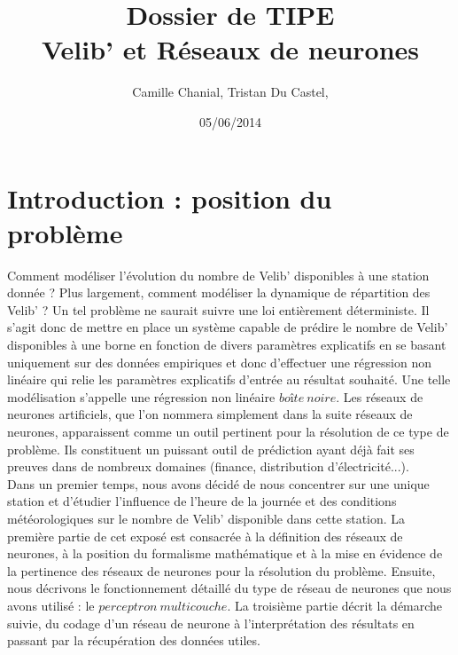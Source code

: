\documentclass[a4paper, 11pt]{article}
\begin{document}
 
\title{Dossier de TIPE \\ Velib' et Réseaux de neurones}
\author{Camille Chanial, Tristan Du Castel, }
\date{05/06/2014} 
 
\maketitle

\tableofcontents
 

\newpage

\section*{Introduction : position du problème}

Comment modéliser l'évolution du nombre de Velib' disponibles à une station donnée ? Plus largement, comment modéliser la dynamique de répartition des Velib' ? Un tel problème ne saurait suivre une loi entièrement déterministe. Il s'agit donc de mettre en place un système capable de prédire le nombre de Velib' disponibles à une borne en fonction de divers paramètres explicatifs en se basant uniquement sur des données empiriques et donc d'effectuer une régression non linéaire qui relie les paramètres explicatifs d'entrée au résultat souhaité. Une telle modélisation s'appelle une régression non linéaire $boîte\ noire$. Les réseaux de neurones artificiels, que l'on nommera simplement dans la suite réseaux de neurones, apparaissent comme un outil pertinent pour la résolution de ce type de problème. Ils constituent un puissant outil de prédiction ayant déjà fait ses preuves dans de nombreux domaines (finance, distribution d'électricité...). \\
Dans un premier temps, nous avons décidé de nous concentrer sur une unique station et d'étudier l'influence de l'heure de la journée et des conditions météorologiques sur le nombre de Velib' disponible dans cette station. La première partie de cet exposé est consacrée à la définition des réseaux de neurones, à la position du formalisme mathématique et à la mise en évidence de la pertinence des réseaux de neurones pour la résolution du problème. Ensuite, nous décrivons le fonctionnement détaillé du type de réseau de neurones que nous avons utilisé : le $perceptron\ multicouche$. La troisième partie décrit la démarche suivie, du codage d'un réseau de neurone à l'interprétation des résultats en passant par la récupération des données utiles. 
\newpage
\end{document}
